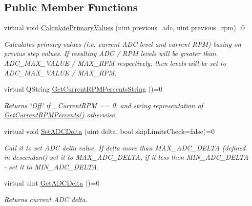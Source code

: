 \subsection*{Public Member Functions}
\begin{DoxyCompactItemize}
\item 
virtual void \hyperlink{class_interfaces_1_1_i_settings_step_a04e46c3ebe1f28e0ad0bce23fb863f66}{Calculate\+Primary\+Values} (uint previous\+\_\+adc, uint previous\+\_\+rpm)=0
\begin{DoxyCompactList}\small\item\em Calculates primary values (i.\+e. current A\+DC level and current R\+PM) basing on previus step values. If resulting A\+DC / R\+PM levels will be greater than A\+D\+C\+\_\+\+M\+A\+X\+\_\+\+V\+A\+L\+UE / M\+A\+X\+\_\+\+R\+PM respectively, then levels will be set to A\+D\+C\+\_\+\+M\+A\+X\+\_\+\+V\+A\+L\+UE / M\+A\+X\+\_\+\+R\+PM. \end{DoxyCompactList}\item 
virtual Q\+String \hyperlink{class_interfaces_1_1_i_settings_step_a7575d43b7d178d700e161ec48e2c766f}{Get\+Current\+R\+P\+M\+Percents\+String} ()=0
\begin{DoxyCompactList}\small\item\em Returns \char`\"{}\+Off\char`\"{} if \+\_\+\+Current\+R\+PM == 0, and string representation of \hyperlink{class_interfaces_1_1_i_settings_step_abbbb49e91352212c6201a85f1a22253f}{Get\+Current\+R\+P\+M\+Percents()} otherwise. \end{DoxyCompactList}\item 
virtual void \hyperlink{class_interfaces_1_1_i_settings_step_a83f00b8b66f6566721065e34e41508c6}{Set\+A\+D\+C\+Delta} (uint delta, bool skip\+Limits\+Check=false)=0
\begin{DoxyCompactList}\small\item\em Call it to set A\+DC delta value. If delta more than M\+A\+X\+\_\+\+A\+D\+C\+\_\+\+D\+E\+L\+TA (defined in descendant) set it to M\+A\+X\+\_\+\+A\+D\+C\+\_\+\+D\+E\+L\+TA, if it less then M\+I\+N\+\_\+\+A\+D\+C\+\_\+\+D\+E\+L\+TA -\/ set it to M\+I\+N\+\_\+\+A\+D\+C\+\_\+\+D\+E\+L\+TA. \end{DoxyCompactList}\item 
virtual uint \hyperlink{class_interfaces_1_1_i_settings_step_ab77c6eaa45707ec4932a8f432b13ad78}{Get\+A\+D\+C\+Delta} ()=0
\begin{DoxyCompactList}\small\item\em Returns current A\+DC delta. \end{DoxyCompactList}\item 

\end{DoxyCompactItemize}
